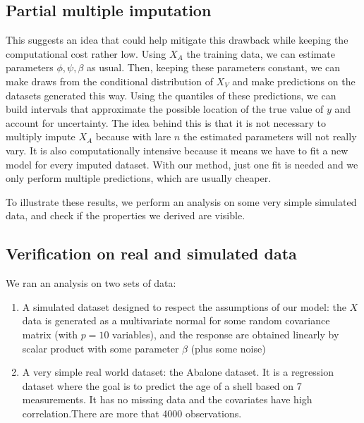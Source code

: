 \documentclass[12pt, a4paper]{memoir}
\begin{document}
\subsection{Partial multiple imputation}
This suggests an idea that could help mitigate this drawback while keeping the computational cost rather low. Using $X_A$ the training data, we can estimate parameters $\phi, \psi, \beta$ as usual. Then, keeping these parameters constant, we can make draws from the conditional distribution of $X_V$ and make predictions on the datasets generated this way. Using the quantiles of these predictions, we can build intervals that approximate the possible location of the true value of $y$ and account for uncertainty. The idea behind this is that it is not necessary to multiply impute $X_A$ because with lare $n$ the estimated parameters will not really vary. It is also computationally intensive because it means we have to fit a new model for every imputed dataset. With our method, just one fit is needed and we only perform multiple predictions, which are usually cheaper.

To illustrate these results, we perform an analysis on some very simple simulated data, and check if the properties we derived are visible.
		\subsection{Verification on real and simulated data}
We ran an analysis on two sets of data:
\begin{enumerate}
\item A simulated dataset designed to respect the assumptions of our model: the $X$ data is generated as a multivariate normal for some random covariance matrix (with $p=10$ variables), and the response are obtained linearly by scalar product with some parameter $\beta$ (plus some noise)
\item A very simple real world dataset: the Abalone dataset. It is a regression dataset where the goal is to predict the age of a shell based on 7 measurements. It has no missing data and the covariates have high correlation.There are more that 4000 observations.
\end{enumerate}
\end{document}
